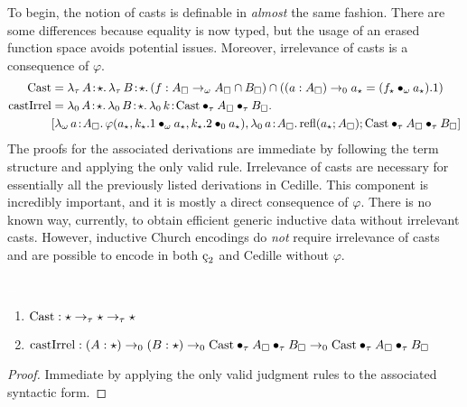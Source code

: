 To begin, the notion of casts is definable in \textit{almost} the same fashion.
There are some differences because equality is now typed, but the usage of an erased function space avoids potential issues.
Moreover, irrelevance of casts is a consequence of $\varphi$.
\begin{align*}
    \pCast &= \abs{\lambda_\tau}{A}{\star}{
        \abs{\lambda_\tau}{B}{\star}{
            (f : A_\square \to_\omega A_\square \cap B_\square)
            \cap ((a:A_\square) \to_0 a_\star = (\app{f_\star}{\omega}{a_\star}).1)
        }
    } \\
    \pcastIrrel &= \abs{\lambda_0}{A}{\star}{
        \abs{\lambda_0}{B}{\star}{
            \abs{\lambda_0}{k}{\apptwo{\pCast}{\tau}{A_\square}{\tau}{B_\square}}{
                \\ &[\abs{\lambda_\omega}{a}{A_\square}{
                    \varphi(a_\star, \app{k_\star.1}{\omega}{a_\star}, \app{k_\star.2}{0}{a_\star})
                }, \abs{\lambda_0}{a}{A_\square}{
                    \prefl(a_\star; A_\square)
                };
                \apptwo{\pCast}{\tau}{A_\square}{\tau}{B_\square}]
            }
        }
    }
\end{align*}
The proofs for the associated derivations are immediate by following the term structure and applying the only valid rule.
Irrelevance of casts are necessary for essentially all the previously listed derivations in Cedille.
This component is incredibly important, and it is mostly a direct consequence of $\varphi$.
There is no known way, currently, to obtain efficient generic inductive data without irrelevant casts.
However, inductive Church encodings do \textit{not} require irrelevance of casts and are possible to encode in both $\ced$ and Cedille without $\varphi$.
\begin{theorem}
    \label{lem:2:cast_derivations}
    \textcolor{white}{\_}
    \begin{enumerate}
        \item $\textnormal{Cast} : \star \to_\tau \star \to_\tau \star$
        \item $\textnormal{castIrrel} : (A:\star) \to_0 (B:\star) \to_0 \textnormal{Cast} \bullet_{\tau} A_\square \bullet_{\tau} B_\square \to_0 \textnormal{Cast} \bullet_{\tau} A_\square \bullet_{\tau} B_\square$
    \end{enumerate}
\end{theorem}
\begin{proof}
    Immediate by applying the only valid judgment rules to the associated syntactic form.
\end{proof}
